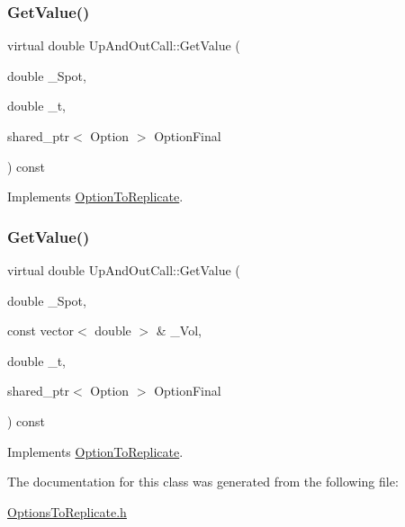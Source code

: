\hypertarget{classUpAndOutCall_a472ab725d98145e17219dbc6106b7b5c}{}\label{classUpAndOutCall_a472ab725d98145e17219dbc6106b7b5c} 
\subsubsection{\texorpdfstring{Get\+Value()}{GetValue()}\hspace{0.1cm}{\footnotesize\ttfamily [1/2]}}
{\footnotesize\ttfamily virtual double Up\+And\+Out\+Call\+::\+Get\+Value (\begin{DoxyParamCaption}\item[{double}]{\+\_\+\+Spot,  }\item[{double}]{\+\_\+t,  }\item[{shared\+\_\+ptr$<$ Option $>$}]{Option\+Final }\end{DoxyParamCaption}) const\hspace{0.3cm}{\ttfamily [virtual]}}



Implements \hyperlink{classOptionToReplicate_a7f39f64594b4baffb45d61a65b38c6b2}{Option\+To\+Replicate}.

\hypertarget{classUpAndOutCall_a6e3ed611443089f59d148e4f30428b0b}{}\label{classUpAndOutCall_a6e3ed611443089f59d148e4f30428b0b} 
\subsubsection{\texorpdfstring{Get\+Value()}{GetValue()}\hspace{0.1cm}{\footnotesize\ttfamily [2/2]}}
{\footnotesize\ttfamily virtual double Up\+And\+Out\+Call\+::\+Get\+Value (\begin{DoxyParamCaption}\item[{double}]{\+\_\+\+Spot,  }\item[{const vector$<$ double $>$ \&}]{\+\_\+\+Vol,  }\item[{double}]{\+\_\+t,  }\item[{shared\+\_\+ptr$<$ Option $>$}]{Option\+Final }\end{DoxyParamCaption}) const\hspace{0.3cm}{\ttfamily [virtual]}}



Implements \hyperlink{classOptionToReplicate_a738f813473de4945df377bcd3fe17f6e}{Option\+To\+Replicate}.



The documentation for this class was generated from the following file\+:\begin{DoxyCompactItemize}
\item 
\hyperlink{OptionsToReplicate_8h}{Options\+To\+Replicate.\+h}\end{DoxyCompactItemize}

